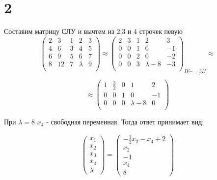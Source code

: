 \documentclass[a4paper]{article}
\begin{document}
\section*{2}

Составим матрицу СЛУ и вычтем из 2,3 и 4 строчек певую
\begin{equation*}
   \left(\begin{array}{rrrr|r}
   2 & 3 & 1 & 2 & 3\\
   4 & 6 & 3 & 4 & 5\\
   6 & 9 & 5 & 6 & 7\\ 
   8 & 12 & 7 & \lambda & 9\\ 
   \end{array}\right)
\approx
   \left(\begin{array}{rrrr|r}
   2 & 3 & 1 & 2 & 3\\ 
   0 & 0 & 1 & 0 & -1\\
   0 & 0 & 2 & 0 & -2\\ 
   0 & 0 & 3 & \lambda - 8 & -3\\ 
   \end{array}\right)_{IV -= 3II}
  \approx
\end{equation*}



\begin{equation*}
\approx
   \left(\begin{array}{rrrr|r}
   1 & \frac{3}{2} & 0 & 1 & 2\\ 
   0 & 0 & 1 & 0 & -1\\
   0 & 0 & 0 & \lambda - 8 & 0\\ 
   \end{array}\right)
\end{equation*}

При $\lambda = 8$ $x_4 $ - свободная переменная.
Тогда ответ принимает вид:

\begin{equation*}
\begin{pmatrix}
  x_1 \\
  x_2\\
  x_3\\
  x_4\\
  \lambda
\end{pmatrix} = 
\begin{pmatrix}
  -\frac{3}{2}x_2 - x_4 + 2\\
x_2\\
	-1\\
	x_4\\
	8
\end{pmatrix}
\end{equation*}
\end{document}
